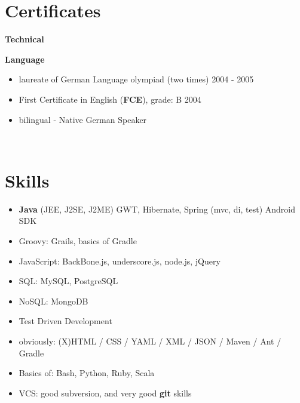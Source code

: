 \documentclass{res}
\begin{document}
\begin{resume}
\section{Certificates} 
{\bf Technical}
{\bf Language}
\begin{itemize}
 \item laureate of German Language olympiad (two times) \hfill 2004 - 2005
 \item First Certificate in English (\textbf{FCE}), grade: B \hfill 2004
 \item bilingual - Native German Speaker
\end{itemize}

\\
\section{Skills}
\begin{itemize}
 \item \textbf{Java} (JEE, J2SE, J2ME)
 \subitem GWT, Hibernate, Spring (mvc, di, test)
 \subitem Android SDK
 \item Groovy: Grails, basics of Gradle
 \item JavaScript: BackBone.js, underscore.js, node.js, jQuery
 \item SQL: MySQL, PostgreSQL
 \item NoSQL: MongoDB 
 \item Test Driven Development
 \item obviously: (X)HTML / CSS / YAML / XML / JSON / Maven / Ant / Gradle
 \item Basics of: Bash, Python, Ruby, Scala
 \item VCS: good subversion, and very good \textbf{git} skills
\end{itemize}


\end{resume}
\end{document}
